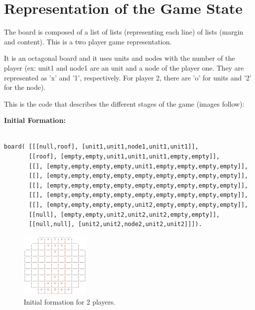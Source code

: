 \documentclass[a4paper]{article}
\begin{document}


\section{Representation of the Game State}

The board is composed of a list of lists (representing each line) of lists (margin and content). This is a two player game representation.

It is an octagonal board and it uses units and nodes with the number of the player (ex: unit1 and node1 are an unit and a node of the player one. They are represented as 'x' and '1', respectively. For player 2, there are 'o' for units and '2' for the node). 

This is the code that describes the different stages of the game (images follow):

\textbf{Initial Formation:}

\begin{lstlisting}

board( [[[null,roof], [unit1,unit1,node1,unit1,unit1]],
       [[roof], [empty,empty,unit1,unit1,unit1,empty,empty]],
       [[], [empty,empty,empty,empty,unit1,empty,empty,empty,empty]],
       [[], [empty,empty,empty,empty,empty,empty,empty,empty,empty]],
       [[], [empty,empty,empty,empty,empty,empty,empty,empty,empty]],
       [[], [empty,empty,empty,empty,empty,empty,empty,empty,empty]],
       [[], [empty,empty,empty,empty,unit2,empty,empty,empty,empty]],
       [[null], [empty,empty,unit2,unit2,unit2,empty,empty]],
       [[null,null], [unit2,unit2,node2,unit2,unit2]]]).
\end{lstlisting}

\begin{figure}[h!]
	\centering
	\includegraphics[width=0.3\textwidth]{InitialFormation.png}
	\caption{Initial formation for 2 players.}
	\label{Image: initformation}
\end{figure}
\end{document}
